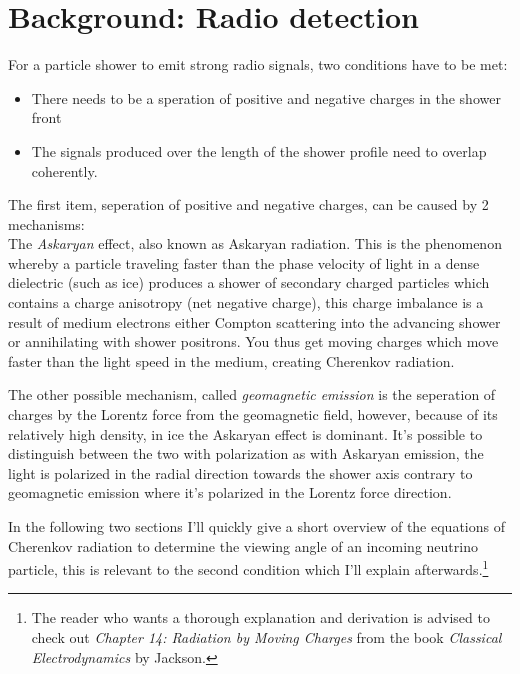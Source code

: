 \documentclass[11pt,a4paper,faculty=we,language=en,doctype=report]{cls/ugent-doc}
\begin{document}
\chapter{Background: Radio detection}
For a particle shower to emit strong radio signals, two conditions have to be met:
\begin{itemize}
	\item There needs to be a speration of positive and negative charges in the shower front 
	\item The signals produced over the length of the shower profile need to overlap coherently.
\end{itemize}
The first item, seperation of positive and negative charges, can be caused by 2
mechanisms:\vspace{0.2cm}\\
The \textit{Askaryan} \cite{Askaryan} effect, also known as Askaryan
radiation. This is the phenomenon whereby a particle traveling faster than the
phase velocity of light in a dense dielectric (such as ice) produces a shower
of secondary charged particles which contains a charge anisotropy (net negative
charge), this charge imbalance is a result of medium electrons either Compton
scattering into the advancing shower or annihilating with shower positrons. You
thus get moving charges which move faster than the light speed in the medium,
creating Cherenkov radiation.

The other possible mechanism, called \textit{geomagnetic emission} is the
seperation of charges by the Lorentz force from the geomagnetic field, however,
because of its relatively high density, in ice the Askaryan effect is dominant.
It's possible to distinguish between the two with polarization as with Askaryan
emission, the light is polarized in the radial direction towards the shower
axis contrary to geomagnetic emission where it's polarized in the Lorentz force
direction.

In the following two sections I'll quickly give a short overview of the
equations of Cherenkov radiation to determine the viewing angle of an incoming
neutrino particle, this is relevant to the second condition which I'll explain
afterwards.\footnote{The reader who wants a thorough explanation and derivation is
advised to check out \textit{Chapter 14: Radiation by Moving Charges} from the
book \textit{Classical Electrodynamics} by Jackson.} 
\newpage
\end{document}
